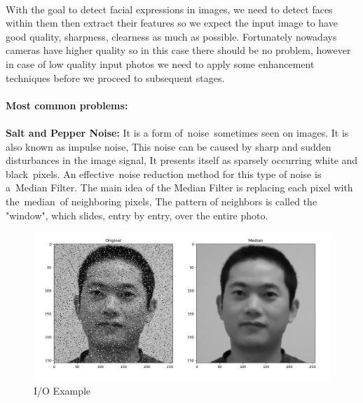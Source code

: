 \paragraph{}
With the goal to detect facial expressions in images, we need to detect faces within them then extract their features so we expect the input image to have good quality, sharpness, clearness as much as possible.\newline
Fortunately nowadays cameras have higher quality so in this case there should be no problem, however in case of low quality input photos we need to apply some enhancement techniques before we proceed to subsequent stages.

\paragraph{}
\textbf{Most common problems:}\newline

\paragraph{}
\textbf{Salt and Pepper Noise:}\newline
It is a form of noise sometimes seen on images. It is also known as impulse noise, This noise can be caused by sharp and sudden disturbances in the image signal, It presents itself as sparsely occurring white and black pixels.\newline
An effective noise reduction method for this type of noise is a Median Filter.\newline
The main idea of the Median Filter is  replacing each pixel with the median of neighboring pixels, The pattern of neighbors is called the "window", which slides, entry by entry, over the entire photo.

\begin{figure}[H]
	\centering
	\includegraphics[width=\linewidth]{images/salt_pepper.jpg}
	\caption{I/O Example}
\end{figure}

